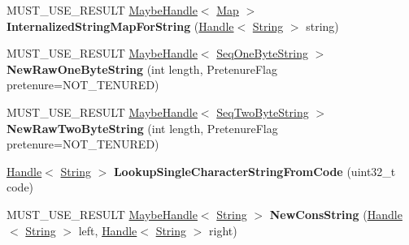 \begin{DoxyCompactItemize}
\item 
M\+U\+S\+T\+\_\+\+U\+S\+E\+\_\+\+R\+E\+S\+U\+LT \hyperlink{classv8_1_1internal_1_1_maybe_handle}{Maybe\+Handle}$<$ \hyperlink{classv8_1_1internal_1_1_map}{Map} $>$ {\bfseries Internalized\+String\+Map\+For\+String} (\hyperlink{classv8_1_1internal_1_1_handle}{Handle}$<$ \hyperlink{classv8_1_1internal_1_1_string}{String} $>$ string)\hypertarget{classv8_1_1internal_1_1_factory_a0974722057fbb90196db776a07052a38}{}\label{classv8_1_1internal_1_1_factory_a0974722057fbb90196db776a07052a38}

\item 
M\+U\+S\+T\+\_\+\+U\+S\+E\+\_\+\+R\+E\+S\+U\+LT \hyperlink{classv8_1_1internal_1_1_maybe_handle}{Maybe\+Handle}$<$ \hyperlink{classv8_1_1internal_1_1_seq_one_byte_string}{Seq\+One\+Byte\+String} $>$ {\bfseries New\+Raw\+One\+Byte\+String} (int length, Pretenure\+Flag pretenure=N\+O\+T\+\_\+\+T\+E\+N\+U\+R\+ED)\hypertarget{classv8_1_1internal_1_1_factory_a07b6db64d4e33dff5a5e6075a53892d5}{}\label{classv8_1_1internal_1_1_factory_a07b6db64d4e33dff5a5e6075a53892d5}

\item 
M\+U\+S\+T\+\_\+\+U\+S\+E\+\_\+\+R\+E\+S\+U\+LT \hyperlink{classv8_1_1internal_1_1_maybe_handle}{Maybe\+Handle}$<$ \hyperlink{classv8_1_1internal_1_1_seq_two_byte_string}{Seq\+Two\+Byte\+String} $>$ {\bfseries New\+Raw\+Two\+Byte\+String} (int length, Pretenure\+Flag pretenure=N\+O\+T\+\_\+\+T\+E\+N\+U\+R\+ED)\hypertarget{classv8_1_1internal_1_1_factory_a15ab7fc8507bc7e1fd0ffe261578344d}{}\label{classv8_1_1internal_1_1_factory_a15ab7fc8507bc7e1fd0ffe261578344d}

\item 
\hyperlink{classv8_1_1internal_1_1_handle}{Handle}$<$ \hyperlink{classv8_1_1internal_1_1_string}{String} $>$ {\bfseries Lookup\+Single\+Character\+String\+From\+Code} (uint32\+\_\+t code)\hypertarget{classv8_1_1internal_1_1_factory_a094f90af8e12110477d89af1489588f7}{}\label{classv8_1_1internal_1_1_factory_a094f90af8e12110477d89af1489588f7}

\item 
M\+U\+S\+T\+\_\+\+U\+S\+E\+\_\+\+R\+E\+S\+U\+LT \hyperlink{classv8_1_1internal_1_1_maybe_handle}{Maybe\+Handle}$<$ \hyperlink{classv8_1_1internal_1_1_string}{String} $>$ {\bfseries New\+Cons\+String} (\hyperlink{classv8_1_1internal_1_1_handle}{Handle}$<$ \hyperlink{classv8_1_1internal_1_1_string}{String} $>$ left, \hyperlink{classv8_1_1internal_1_1_handle}{Handle}$<$ \hyperlink{classv8_1_1internal_1_1_string}{String} $>$ right)\hypertarget{classv8_1_1internal_1_1_factory_ad5905f8e4fb889aa3fb5253dbe6344b6}{}\label{classv8_1_1internal_1_1_factory_ad5905f8e4fb889aa3fb5253dbe6344b6}


\end{DoxyCompactItemize}
